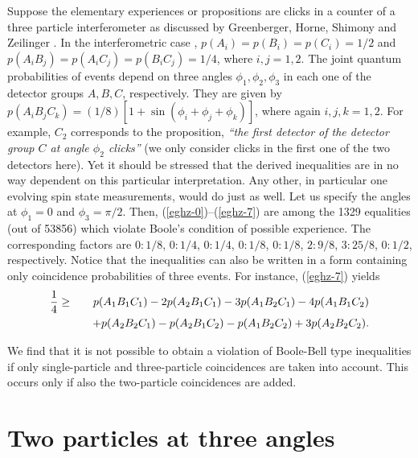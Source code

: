 Suppose the elementary experiences or propositions are
clicks in a counter of a three particle interferometer as  discussed by
Greenberger, Horne, Shimony and Zeilinger \cite{ghsz}.
In the interferometric case \cite{ghsz},
$p(A_i)=p(B_i)=p(C_i)=1/2$ and
$p(A_iB_j)=p(A_iC_j)=p(B_iC_j)=1/4$, where $i,j=1,2$.
The joint quantum probabilities of events depend on three angles
$\phi_1,\phi_2,\phi_3$ in each one of the detector groups $A,B,C$, respectively.
They are given by
$
p(A_iB_jC_k)=
(1/8)[1+\sin (\phi_i+\phi_j+\phi_k)]
$, where again $i,j,k =1,2$.
For example, $C_2$ corresponds to the  proposition,
{\em ``the first detector of the detector group $C$ at angle $\phi_2$ clicks''}
(we only consider clicks in the first one of the two detectors here).
Yet it should be stressed that the derived inequalities are in no way dependent
on this particular interpretation. Any other, in particular one evolving spin state measurements,
would do just as well.
Let us specify the angles at $\phi_1=0$ and $\phi_3=\pi /2$.
Then,
(\ref{eghz-0})--(\ref{eghz-7})
are among the  1329 equalities (out of 53856) which
violate  Boole's condition of possible experience.
The corresponding
factors are
$ 0 :  1/8$,
$ 0 :  1/4$,
$ 0 :  1/4$,
$ 0 :  1/8$,
$ 0 :  1/8$,
 $2 :  9/8$,
 $3 :  25/8$,
 $0 :  1/2$,
respectively.
Notice that the inequalities can also be written in a form containing only
coincidence probabilities of three events.
For instance, (\ref{eghz-7}) yields
\begin{eqnarray}
{1\over 4} &\ge&
 p(A_1B_1C_1) -2p(A_2B_1C_1) -3p(A_1B_2C_1) -4p(A_1B_1C_2)
\nonumber\\&&\quad
+ p(A_2B_2C_1) - p(A_2B_1C_2) - p(A_1B_2C_2) +3p(A_2B_2C_2).
\label{eghz-7a}
\end{eqnarray}

We find that it is not possible to obtain  a violation of Boole-Bell type inequalities
if only  single-particle and three-particle coincidences are taken into account.
This occurs only if also the two-particle coincidences are added.


\section{Two particles at three angles}

